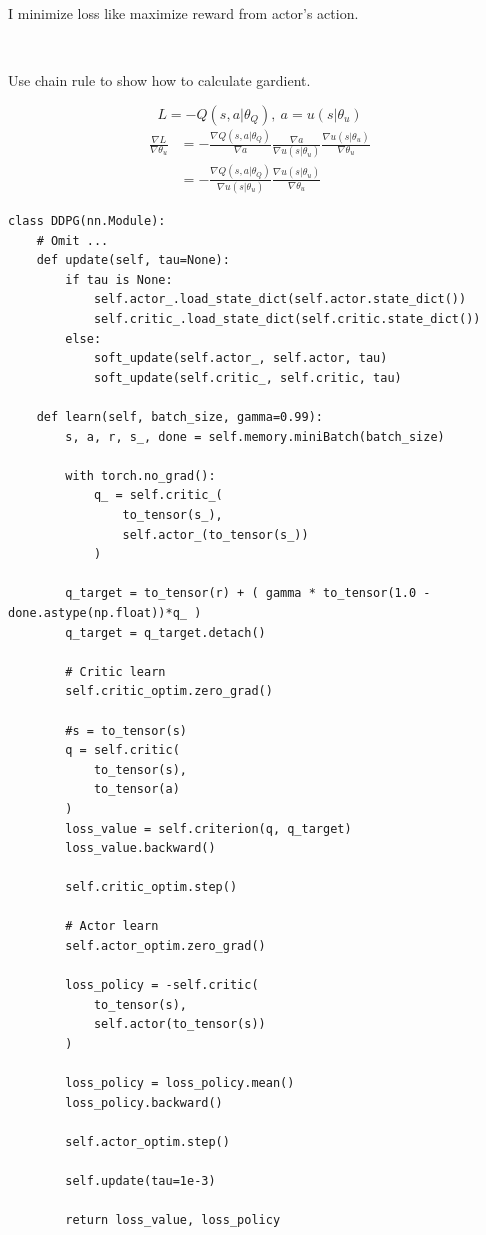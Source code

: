\documentclass[12pt]{article}
\begin{document}
I minimize loss like maximize reward from actor's action.
\par \ \par
Use chain rule to show how to calculate gardient.

\begin{equation}
    L =  - Q(s, a | \theta_Q), \  a = u(s | \theta_u)
\end{equation}
\begin{align}
    \frac{\nabla L }{ \nabla \theta_u } & = - \frac{ \nabla Q(s, a | \theta_Q) }{ \nabla a } \frac{\nabla a}{\nabla u(s | \theta_u)} \frac{\nabla u(s | \theta_u)}{\nabla \theta_u} \\
    & = - \frac{ \nabla Q(s, a | \theta_Q) }{ \nabla u(s | \theta_u) }\frac{\nabla u(s | \theta_u)}{\nabla \theta_u}
\end{align}


\begin{verbatim}
class DDPG(nn.Module):
    # Omit ...
    def update(self, tau=None):
        if tau is None:
            self.actor_.load_state_dict(self.actor.state_dict())
            self.critic_.load_state_dict(self.critic.state_dict())
        else:
            soft_update(self.actor_, self.actor, tau)
            soft_update(self.critic_, self.critic, tau)
            
    def learn(self, batch_size, gamma=0.99):
        s, a, r, s_, done = self.memory.miniBatch(batch_size)

        with torch.no_grad():
            q_ = self.critic_(
                to_tensor(s_), 
                self.actor_(to_tensor(s_)) 
            )
        
        q_target = to_tensor(r) + ( gamma * to_tensor(1.0 - done.astype(np.float))*q_ )
        q_target = q_target.detach()
        
        # Critic learn
        self.critic_optim.zero_grad()
        
        #s = to_tensor(s)
        q = self.critic(
            to_tensor(s),
            to_tensor(a)
        )
        loss_value = self.criterion(q, q_target)
        loss_value.backward()
        
        self.critic_optim.step()
        
        # Actor learn
        self.actor_optim.zero_grad()
        
        loss_policy = -self.critic(
            to_tensor(s),
            self.actor(to_tensor(s))
        )
        
        loss_policy = loss_policy.mean()
        loss_policy.backward()
        
        self.actor_optim.step()
        
        self.update(tau=1e-3)
        
        return loss_value, loss_policy
\end{verbatim}
\end{document}
